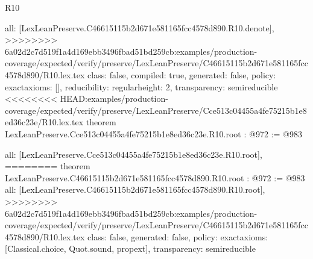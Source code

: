 \begin{lexlean}{R10}
\begin{coremodule}
{{{{{  all: [LexLeanPreserve.C46615115b2d671e581165fcc4578d890.R10.denote],
>>>>>>>> 6a02d2c7d519f1a4d169ebb3496fbad51bd259cb:examples/production-coverage/expected/verify/preserve/LexLeanPreserve/C46615115b2d671e581165fcc4578d890/R10.lex.tex
  class: false,
  compiled: true,
  generated: false,
  policy: exact{axioms: []},
  reducibility: regular{height: 2},
  transparency: semireducible
}
<<<<<<<< HEAD:examples/production-coverage/expected/verify/preserve/LexLeanPreserve/Cce513c04455a4fe75215b1e8ed36c23e/R10.lex.tex
theorem LexLeanPreserve.Cce513c04455a4fe75215b1e8ed36c23e.R10.root : @972 := @983 {
  all: [LexLeanPreserve.Cce513c04455a4fe75215b1e8ed36c23e.R10.root],
========
theorem LexLeanPreserve.C46615115b2d671e581165fcc4578d890.R10.root : @972 := @983 {
  all: [LexLeanPreserve.C46615115b2d671e581165fcc4578d890.R10.root],
>>>>>>>> 6a02d2c7d519f1a4d169ebb3496fbad51bd259cb:examples/production-coverage/expected/verify/preserve/LexLeanPreserve/C46615115b2d671e581165fcc4578d890/R10.lex.tex
  class: false,
  generated: false,
  policy: exact{axioms: [Classical.choice, Quot.sound, propext]},
  transparency: semireducible
}

}}}}}
\end{coremodule}
\end{lexlean}
